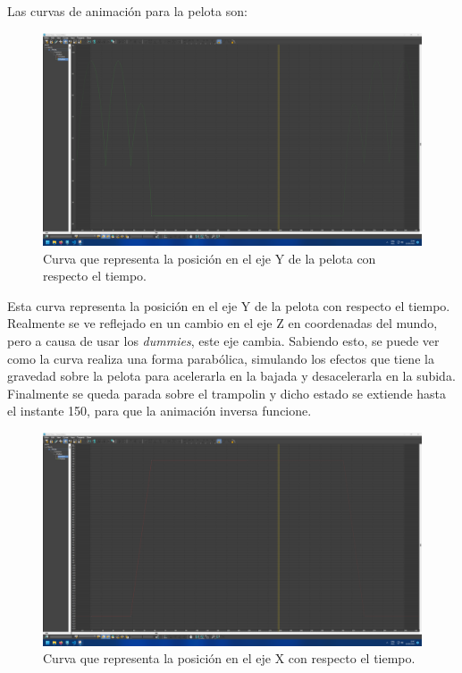 \documentclass{article}
\begin{document}
Las curvas de animación para la pelota son:

\begin{figure}[H]
   \centering
   \includegraphics[width=\textwidth]{imagenes/curvas/PL/pelota/green.png}
   \caption{Curva que representa la posición en el eje Y de la pelota con respecto el tiempo.}
\end{figure}

Esta curva representa la posición en el eje Y de la pelota con respecto el tiempo. Realmente se ve reflejado en un cambio en el eje Z en coordenadas del mundo, pero a causa de usar los \textit{dummies}, este eje cambia. Sabiendo esto, se puede ver como la curva realiza una forma parabólica, simulando los efectos que tiene la gravedad sobre la pelota para acelerarla en la bajada y desacelerarla en la subida. Finalmente se queda parada sobre el trampolin y dicho estado se extiende hasta el instante 150, para que la animación inversa funcione.

\begin{figure}[H]
   \centering
   \includegraphics[width=\textwidth]{imagenes/curvas/PL/pelota/red.png}
   \caption{Curva que representa la posición en el eje X con respecto el tiempo.}
\end{figure}
\end{document}
